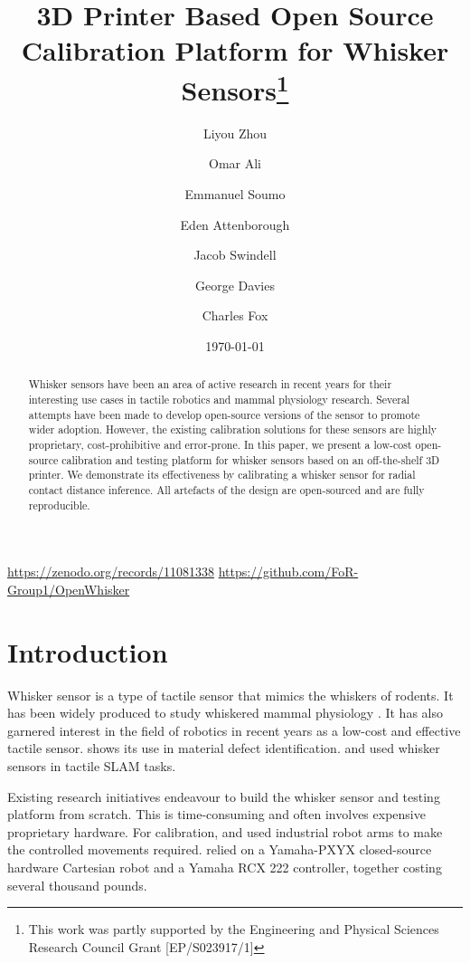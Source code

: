 \documentclass[runningheads]{llncs}
\title{3D Printer Based Open Source Calibration Platform for Whisker Sensors\thanks{This work was partly supported by the Engineering and Physical Sciences
Research Council Grant [EP/S023917/1]}}
\author{
    Liyou Zhou\orcidID{0009-0005-9491-9003} \and
    Omar Ali \orcidID{0009-0009-3523-6084} \and
    Emmanuel Soumo \and
    Eden Attenborough \and
    Jacob Swindell \and
    George Davies \and
    Charles Fox
}
\institute{School of Computer Science, University of Lincoln, Lincoln, UK}
\date{\today}
\begin{document}
\maketitle

\vspace{-10pt}

\begin{center}
    \url{https://zenodo.org/records/11081338}
    \url{https://github.com/FoR-Group1/OpenWhisker}
\end{center}

\begin{abstract}
Whisker sensors have been an area of active research in recent years for their interesting use cases in tactile robotics and mammal physiology research. Several attempts have been made to develop open-source versions of the sensor to promote wider adoption. However, the existing calibration solutions for these sensors are highly proprietary, cost-prohibitive and error-prone. In this paper, we present a low-cost open-source calibration and testing platform for whisker sensors based on an off-the-shelf 3D printer. We demonstrate its effectiveness by calibrating a whisker sensor for radial contact distance inference. All artefacts of the design are open-sourced and are fully reproducible.
\end{abstract}

\section{Introduction}

Whisker sensor is a type of tactile sensor that mimics the whiskers of rodents. It has been widely produced to study whiskered mammal physiology \cite{prescottActiveTouchSensing2020}. It has also garnered interest in the field of robotics in recent years as a low-cost and effective tactile sensor. \cite{fotouhiDetectionBarelyVisible2021} shows its use in material defect identification. \cite{struckmeierViTaSLAMBioinspiredVisuoTactile2019} and \cite{foxTactileSLAMBiomimetic2012} used whisker sensors in tactile SLAM tasks.

Existing research initiatives endeavour to build the whisker sensor and testing platform from scratch. This is time-consuming and often involves expensive proprietary hardware. For calibration, \cite{sullivanTactileDiscriminationUsing2012} and \cite{fotouhiDetectionBarelyVisible2021} used industrial robot arms to make the controlled movements required. \cite{evansWhiskerobjectContactSpeed2010} relied on a Yamaha-PXYX closed-source hardware Cartesian robot and a Yamaha RCX 222 controller, together costing several thousand pounds.
\end{document}
